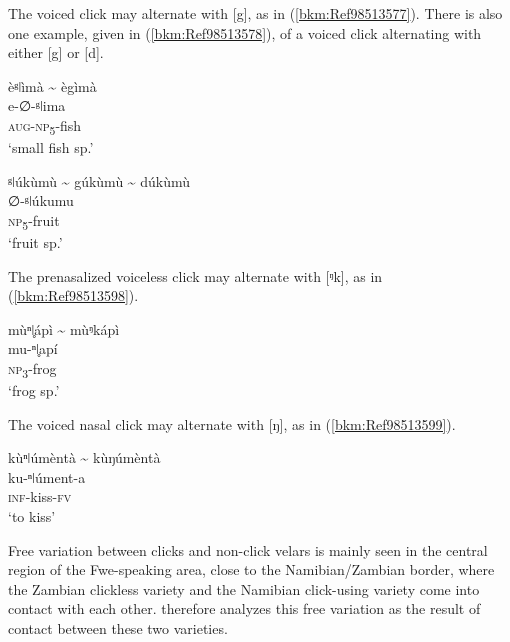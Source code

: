 The voiced click may alternate with [g], as in (\ref{bkm:Ref98513577}). There is also one example, given in (\ref{bkm:Ref98513578}), of a voiced click alternating with either [g] or [d].

\ea
\label{bkm:Ref98513577}
èᵍǀìmà {\textasciitilde} ègìmà\\
e-∅-ᵍǀima\\
\textsc{aug}-\textsc{np}\textsubscript{5}-fish\\
\glt ‘small fish sp.’
\z

\ea
\label{bkm:Ref98513578}
ᵍǀúkùmù {\textasciitilde} gúkùmù {\textasciitilde} dúkùmù\\
∅-ᵍǀúkumu\\
\textsc{np}\textsubscript{5}-fruit\\
\glt ‘fruit sp.’
\z

The prenasalized voiceless click may alternate with [ᵑk], as in (\ref{bkm:Ref98513598}).

\ea
\label{bkm:Ref98513598}
mùⁿǀ̥ápì {\textasciitilde} mùᵑkápì\\
mu-ⁿ{ǀ}̥apí\\
\textsc{np}\textsubscript{3}-frog \\
\glt ‘frog sp.’
\z

The voiced nasal click may alternate with [ŋ], as in (\ref{bkm:Ref98513599}).

\ea
\label{bkm:Ref98513599}
kùⁿǀúmèntà {\textasciitilde} kùŋúmèntà\\
ku-ⁿǀúment-a\\
\textsc{inf}-kiss-\textsc{fv}\\
\glt ‘to kiss’
\z

Free variation between clicks and non-click velars is mainly seen in the central region of the Fwe-speaking area, close to the Namibian/Zambian border, where the Zambian clickless vari\-ety and the Namibian click-using variety come into contact with each other. {\citet{Gunnink2020}} therefore analyzes this free variation as the result of contact between these two varieties.

